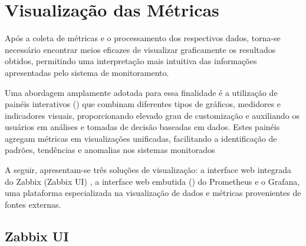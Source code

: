 \section{Visualização das Métricas}
\label{section:VisualizacaoMetricas}

{\color{red}

Após a coleta de métricas e o processamento dos respectivos dados, torna-se necessário encontrar meios eficazes de visualizar graficamente os resultados obtidos, permitindo uma interpretação mais intuitiva das informações apresentadas pelo sistema de monitoramento.

Uma abordagem amplamente adotada para essa finalidade é a utilização de painéis interativos () que combinam diferentes tipos de gráficos, medidores e indicadores visuais, proporcionando elevado grau de customização e auxiliando os usuários em análises e tomadas de decisão baseadas em dados. Estes painéis agregam métricas em visualizações unificadas, facilitando a identificação de padrões, tendências e anomalias nos sistemas monitorados

A seguir, apresentam-se três soluções de visualização: a interface web integrada do Zabbix (Zabbix UI) , a interface web embutida () do Prometheus  e o Grafana, uma plataforma especializada na visualização de dados e métricas provenientes de fontes externas.

}

\subsection{Zabbix UI}
\label{subsection:ZabbixUI}

